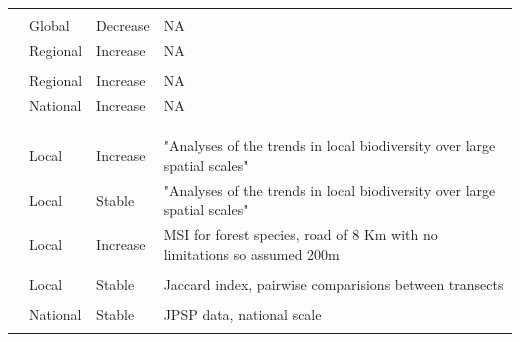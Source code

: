 \documentclass[
  12pt,
  oneside]{report}
\begin{document}
\begin{landscape}
\begin{longtable}[t]{>{\raggedright\arraybackslash}p{6.5em}>{\raggedright\arraybackslash}p{6.5em}>{\raggedright\arraybackslash}p{6.5em}>{\raggedright\arraybackslash}p{40em}}
\cellcolor{gray!6}{} & \cellcolor{gray!6}{National} & \cellcolor{gray!6}{Increase} & \cellcolor{gray!6}{\vphantom{1} NA}\\
\addlinespace
 & Global & Decrease & NA\\
 & Regional & Increase & \vphantom{1} NA\\
\cellcolor{gray!6}{} & \cellcolor{gray!6}{Regional} & \cellcolor{gray!6}{Increase} & \cellcolor{gray!6}{NA}\\
 & Regional & Increase & NA\\
 & National & Increase & NA\\
\addlinespace
\cellcolor{gray!6}{} & \cellcolor{gray!6}{Global} & \cellcolor{gray!6}{Stable} & \cellcolor{gray!6}{NA}\\
\cite{pilotto_meta-analysis_2020}\cellcolor{gray!6}{} & \cellcolor{gray!6}{Local} & \cellcolor{gray!6}{Stable} & \cellcolor{gray!6}{"Analyses of the trends in local biodiversity over large spatial scales"}\\
\cellcolor{gray!6}{} & \cellcolor{gray!6}{Local} & \cellcolor{gray!6}{Increase} & \cellcolor{gray!6}{Metric = Simpson, "Analyses of the trends in local biodiversity over large spatial scales"}\\
 & Local & Increase & "Analyses of the trends in local biodiversity over large spatial scales"\\
 & Local & Stable & "Analyses of the trends in local biodiversity over large spatial scales"\\
\addlinespace
\cite{ram_what_2017} & Local & Increase & MSI for forest species, road of 8 Km with no limitations so assumed 200m\\
\cellcolor{gray!6}{} & \cellcolor{gray!6}{Regional} & \cellcolor{gray!6}{Increase} & \cellcolor{gray!6}{SR for forest species meaned over roads, spatial grain = 8* .4 with road of 8 Km and census radius no limitations so assumed 200m}\\
\cite{reif_changes_2013} & Local & Stable & Jaccard index, pairwise comparisions between transects\\
\cellcolor{gray!6}{} & \cellcolor{gray!6}{Local} & \cellcolor{gray!6}{Stable} & \cellcolor{gray!6}{JPSP data, transect scale}\\
 & National & Stable & JPSP data, national scale\\
\addlinespace
\cellcolor{gray!6}{\cite{schipper_contrasting_2016}} & \cellcolor{gray!6}{Local} & \cellcolor{gray!6}{Increase} & \cellcolor{gray!6}{The metric (i.e. geometric mean) is meaned over each road. Area of the road = 50*(pi*400\^2) with 50 census point per road and a census radius of 400m}\\

\end{longtable}
\end{landscape}
\end{document}

